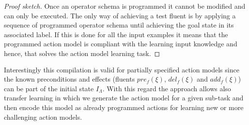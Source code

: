 \documentclass[letterpaper]{article} %
\begin{document}
\begin{proof}[Proof sketch]
Once an operator schema is programmed it cannot be modified and can only be executed. The only way of achieving a test fluent is by applying a sequence of programmed operator schema until achieving the goal state in its associated label. If this is done for all the input examples it means that the programmed action model is compliant with the learning input knowledge and hence, that solves the action model learning task.
\end{proof}

Interestingly this compilation is valid for partially specified action models since the known preconditions and effects (fluents $pre_f(\xi)$, $del_f(\xi)$ and $add_f(\xi)$) can be part of the initial state $I_{\Lambda}$. With this regard the approach allows also transfer learning in which we generate the action model for a given sub-task and then encode this model as already programmed actions for learning new or more challenging action models.
\end{document}
